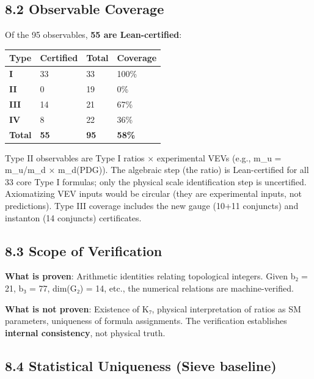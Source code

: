 \documentclass[11pt,a4paper]{article}
\begin{document}
\subsection{8.2 Observable Coverage}\label{observable-coverage}

Of the 95 observables, \textbf{55 are Lean-certified}:

\begin{longtable}[]{@{}llll@{}}
\toprule\noalign{}
Type & Certified & Total & Coverage \\
\midrule\noalign{}
\endhead
\bottomrule\noalign{}
\endlastfoot
\textbf{I} & 33 & 33 & 100\% \\
\textbf{II} & 0 & 19 & 0\% \\
\textbf{III} & 14 & 21 & 67\% \\
\textbf{IV} & 8 & 22 & 36\% \\
\textbf{Total} & \textbf{55} & \textbf{95} & \textbf{58\%} \\
\end{longtable}

Type II observables are Type I ratios × experimental VEVs (e.g., m\_\allowbreak{}u = m\_\allowbreak{}u/m\_\allowbreak{}d × m\_\allowbreak{}d(PDG)). The algebraic step (the ratio) is Lean-certified for all 33 core Type I formulas; only the physical scale identification step is uncertified. Axiomatizing VEV inputs would be circular (they are experimental inputs, not predictions). Type III coverage includes the new gauge (10+11 conjuncts) and instanton (14 conjuncts) certificates.

\subsection{8.3 Scope of Verification}\label{scope-of-verification}

\textbf{What is proven}: Arithmetic identities relating topological integers. Given b₂ = 21, b₃ = 77, dim(G₂) = 14, etc., the numerical relations are machine-verified.

\textbf{What is not proven}: Existence of K₇, physical interpretation of ratios as SM parameters, uniqueness of formula assignments. The verification establishes \textbf{internal consistency}, not physical truth.

\subsection{8.4 Statistical Uniqueness (Sieve baseline)}\label{statistical-uniqueness-sieve-baseline}
\end{document}
